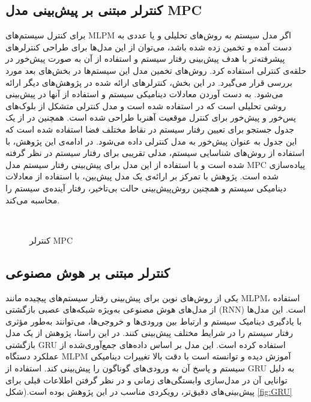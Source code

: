 \subsection{کنترلر مبتنی بر پیش‌بینی مدل MPC}
برای کنترل سیستم‌های MLPM اگر مدل سیستم به روش‌های تحلیلی و یا عددی به دست آمده و تخمین زده شده باشد، می‌توان از این مدل‌ها برای طراحی کنترلرهای پیشرفته‌تر با هدف پیش‌بینی رفتار سیستم و استفاده از آن به صورت پیش‌خور در حلقه‌ی کنترلی استفاده کرد. روش‌های تخمین مدل این سیستم‌ها در بخش‌های بعد مورد بررسی قرار می‌گیرد. در این بخش، کنترلرهای ارائه شده در پژوهش‌های دیگر ارائه می‌شود.
به دست آوردن معادلات دینامیکی سیستم و استفاده از آنها در پیش‌بینی روشی تحلیلی است که در 
\cite{RN55}
 استفاده شده است و مدل کنترلی متشکل از بلوک‌های پس‌خور و پیش‌خور برای کنترل موقعیت آهنربا طراحی شده است. همچنین در 
\cite{RN62}
 از یک جدول جستجو برای تعیین رفتار سیستم در نقاط مختلف فضا استفاده شده است که این جدول به عنوان پیش‌خور به مدل کنترلی داده می‌شود. در ادامه‌ی این پژوهش، با استفاده از روش‌های شناسایی سیستم، مدلی تقریبی برای رفتار سیستم در نظر گرفته شده است و با استفاده از این مدل برای پیش‌بینی رفتار سیستم‌ مدل MPC پیاده‌سازی شده است. پژوهش 
\cite{RN30}
 با تمرکز بر ارائه‌ی یک مدل پیش‌بین، با استفاده از معادلات دینامیکی سیستم و همچنین روش‌پیش‌بینی حالت بی‌تاخیر، رفتار آینده‌ی سیستم را محاسبه می‌کند.
\begin{figure}[ht]
\centering 
{}
\\ %
\caption{کنترلر MPC}
\label{fig:MPC} %
\end{figure}

\FloatBarrier

\subsection{کنترلر مبتنی بر هوش مصنوعی}

یکی از روش‌های نوین برای پیش‌بینی رفتار سیستم‌های پیچیده مانند MLPM، استفاده از مدل‌های هوش مصنوعی به‌ویژه شبکه‌های عصبی بازگشتی (RNN) است. این مدل‌ها با یادگیری دینامیک سیستم و ارتباط بین ورودی‌ها و خروجی‌ها، می‌توانند به‌طور مؤثری رفتار سیستم را در شرایط مختلف پیش‌بینی کنند. در این راستا، پژوهش
\cite{RN61}
از یک مدل بازگشتی GRU 
 استفاده کرده است. این مدل بر اساس داده‌های جمع‌آوری‌شده از عملکرد دستگاه MLPM آموزش دیده و توانسته است با دقت بالا تغییرات دینامیکی سیستم و پاسخ آن به ورودی‌های گوناگون را پیش‌بینی کند. استفاده از GRU به دلیل توانایی آن در مدل‌سازی وابستگی‌های زمانی و در نظر گرفتن اطلاعات قبلی برای پیش‌بینی‌های دقیق‌تر، رویکردی مناسب در این پژوهش بوده است.(شکل 
\ref{fig:GRU}

